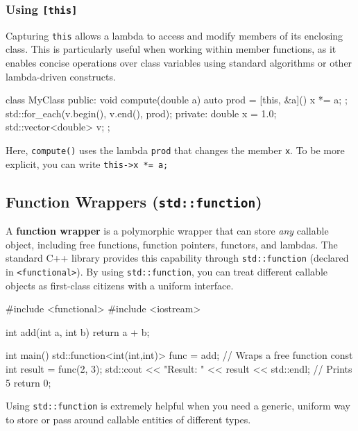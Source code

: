 \subsubsection{Using \texttt{[this]}}

Capturing \texttt{this} allows a lambda to access and modify members of its enclosing class. This is particularly useful when working within member functions, as it enables concise operations over class variables using standard algorithms or other lambda-driven constructs.

\vspace{-0.5em}

\begin{codeblock}[language=C++]
class MyClass {
public:
    void compute(double a) {
        auto prod = [this, &a]() { x *= a; };
        std::for_each(v.begin(), v.end(), prod);
    }
private:
    double x = 1.0;
    std::vector<double> v;
};
\end{codeblock}

\vspace{-0.5em}

Here, \texttt{compute()} uses the lambda \texttt{prod} that changes the member \texttt{x}. To be more explicit, you can write \texttt{this->x *= a;}

\subsection{Function Wrappers (\texttt{std::function})}
A \textbf{function wrapper} is a polymorphic wrapper that can store \textit{any} callable object, including free functions, function pointers, functors, and lambdas. The standard C++ library provides this capability through \texttt{std::function} (declared in \texttt{<functional>}). By using \texttt{std::function}, you can treat different callable objects as first-class citizens with a uniform interface.

\begin{codeblock}[language=C++]
#include <functional>
#include <iostream>

int add(int a, int b) {
    return a + b;
}

int main() {
    std::function<int(int,int)> func = add;  // Wraps a free function
    const int result = func(2, 3);
    std::cout << "Result: " << result << std::endl;  // Prints 5
    return 0;
}
\end{codeblock}

Using \texttt{std::function} is extremely helpful when you need a generic, uniform way to store or pass around callable entities of different types.

